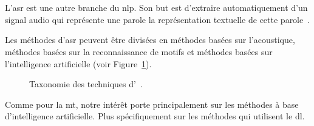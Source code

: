 \section{}

L'\gls{asr} est une autre branche du \gls{nlp}.
Son but est d'extraire automatiquement d'un signal audio qui représente une parole
la représentation textuelle de cette parole~\cite{Huang_Hayashi_Wu_Kameoka_Toda_2021}.

Les méthodes d'\gls{asr} peuvent être divisées en méthodes basées sur l'acoustique,
méthodes basées sur la reconnaissance de motifs
et méthodes basées sur l'intelligence artificielle (voir Figure~\ref{fig.asr-taxonomy-tree}).

\begin{figure}
    \centering
    \resizebox{\textwidth}{!}{}
    \caption[Taxonomie des techniques d'.]
    {Taxonomie des techniques d'~\cite{Volny_Novak_Zezula_2012}.}
    \label{fig.asr-taxonomy-tree}
\end{figure}

Comme pour la \gls{mt},
notre intérêt porte principalement sur les méthodes à base d'intelligence artificielle.
Plus spécifiquement sur les méthodes qui utilisent le \gls{dl}.